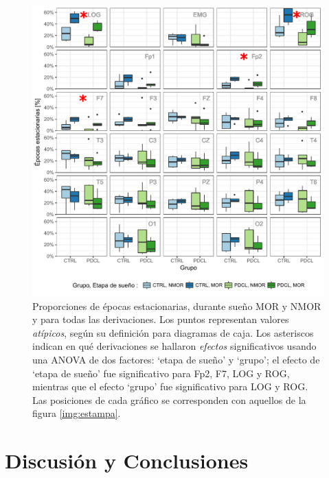 \documentclass[12pt,letterpaper]{book}
\begin{document}
\begin{figure}
\centering
\includegraphics[width=\linewidth]
{./scripts_graf_res/comparacion_cabeza.pdf}
\caption{Proporciones de épocas estacionarias, durante sueño MOR y NMOR y para todas las derivaciones.
%
Los puntos representan valores \textit{atípicos}, según su definición para diagramas de caja.
%
Los asteriscos indican en qué derivaciones se hallaron \textit{efectos} significativos usando una ANOVA de dos factores: `etapa de sueño' y `grupo'; el efecto de `etapa de sueño' fue significativo para Fp2, F7, LOG y ROG, mientras que el efecto `grupo' fue significativo para LOG y ROG.
%
Las posiciones de cada gráfico se corresponden con aquellos de la figura \ref{img:estampa}.}
\label{comparacion_verde}
\end{figure}


\chapter{Discusión y Conclusiones}
\end{document}
